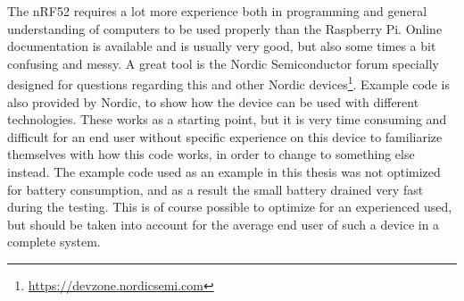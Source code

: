 The \gls{nRF52} requires a lot more experience both in programming and general understanding of computers to be used properly than the \gls{Raspberry Pi}. Online documentation is available and is usually very good, but also some times a bit confusing and messy. A great tool is the Nordic Semiconductor forum specially designed for questions regarding this and other Nordic devices\footnote{\url{https://devzone.nordicsemi.com}}. Example code is also provided by Nordic, to show how the device can be used with different technologies. These works as a starting point, but it is very time consuming and difficult for an end user without specific experience on this device to familiarize themselves with how this code works, in order to change to something else instead. The example code used as an example in this thesis was not optimized for battery consumption, and as a result the small battery drained very fast during the testing. This is of course possible to optimize for an experienced used, but should be taken into account for the average end user of such a device in a complete system. 





